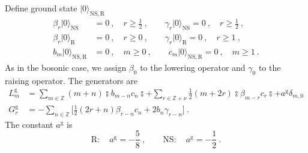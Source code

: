 	Define ground state $\lvert 0\rangle _{\mathrm{NS,R}}$
	\begin{subequations}
		\begin{align}
			\beta_{r}\lvert 0\rangle_{\mathrm{NS}} &= 0\:, \quad r\geq \tfrac{1}{2}\:, \qquad
			\gamma_{r}\lvert 0\rangle_{\mathrm{NS}}=0 \:,\quad r\geq \tfrac{1}{2}\:, \label{10.4.3a} \\
			\beta_{r}\lvert 0\rangle_{\mathrm{R}} &=0 \:, \quad r\geq 0\:, \qquad
			\gamma_{r}\lvert 0\rangle _{\mathrm{R}} =0 \:, \quad r\geq 1\:, \label{10.4.3b} \\
			b_{m}\lvert 0\rangle_{\mathrm{NS,R}}&=0 \:,\quad m\geq 0\:, \qquad 
			c_{m}\lvert 0\rangle_{\mathrm{NS,R}}=0 \:,\quad m\geq 1 \:. \label{10.4.3c}
		\end{align} \label{10.4.3}
	\end{subequations}
	As in the bosonic case, we assign $\beta_{0}$ to the lowering operator and $\gamma_{0}$ to the raising operator. The generators are
	\begin{subequations}
		\begin{align}
			L_{m}^{\mathrm{g}}&=\sum_{m\in\mathds{Z}}(m+n)\typecolon\! b_{m-n}c_{n}\!\typecolon
			+\sum_{r\in\mathds{Z}+\nu} \frac{1}{2}(m+2r)\typecolon\! \beta_{m-r}c_{r}\!\typecolon + a^{\mathrm{g}}\delta_{m,0}\label{10.4.4a} \\
			G_{r}^{\mathrm{g}}&=-\sum_{n\in\mathds{Z}} 
			\biggl[\frac{1}{2}(2r+n)\beta_{r-n}c_{n}+2b_{n}\gamma_{r-n} \biggr] \:. \label{10.4.4b}
		\end{align}
	\end{subequations}
	The constant $a^{\mathrm{g}}$ is
	\begin{equation}
		\mathrm{R}:\quad a^{\mathrm{g}}= -\frac{5}{8} \:, \qquad
		\mathrm{NS}:\quad a^{\mathrm{g}}= -\frac{1}{2} \:. \label{10.4.5}
	\end{equation}
